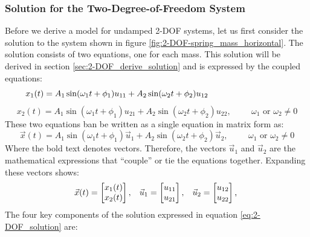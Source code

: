 \documentclass[12pt,letter]{article}
\numberwithin{ex}{section} %
\numberwithin{re}{section} %
\begin{document}
\subsubsection{Solution for the Two-Degree-of-Freedom System}
Before we derive a model for undamped 2-DOF systems, let us first consider the solution to the system shown in figure \ref{fig:2-DOF-spring_mass_horizontal}. The solution consists of two equations, one for each mass. This solution will be derived in section \ref{sec:2-DOF_derive_solution} and is expressed by the coupled equations:
\begin{equation}
	x_1(t) = A_1 \sin (\omega_1 t + \phi_1 )u_{11}+ A_2 \sin (\omega_2 t + \phi_2 )u_{12} \hspace{3.35cm} 
\end{equation}
\begin{equation}
	x_2(t) = A_1 \sin (\omega_1 t + \phi_1 )u_{21}+ A_2 \sin (\omega_2 t + \phi_2 )u_{22} , \hspace{1cm} \omega_1 \text{ or } \omega_2 \neq 0 \nonumber
\end{equation}
These two equations ban be written as a single equation in matrix form as:
\begin{equation}
	\vec{x}(t) = A_1 \sin (\omega_1 t + \phi_1 )\vec{u}_1 + A_2 \sin (\omega_2 t + \phi_2 )\vec{u}_2 , \hspace{1cm} \omega_1 \text{ or } \omega_2 \neq 0
	\label{eq:2-DOF_solution}
\end{equation}
Where the bold text denotes vectors. Therefore, the vectors $\vec{u}_1$ and $\vec{u}_2$ are the mathematical expressions that ``couple'' or tie the equations together. Expanding these vectors shows: 
\begin{eqnarray}
 \vec{x}(t)=  \begin{bmatrix} x_1(t) \\  x_2(t) \end{bmatrix}, \hspace{2ex} \vec{u}_1=  \begin{bmatrix} u_{11} \\  u_{21} \end{bmatrix}, \hspace{2ex} \vec{u}_2=  \begin{bmatrix} u_{12} \\  u_{22} \end{bmatrix}\text{, }
\end{eqnarray}
The four key components of the solution expressed in equation \ref{eq:2-DOF_solution} are:
\end{document}
